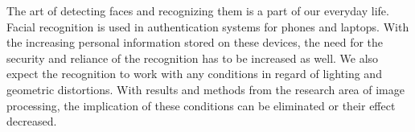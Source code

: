 The art of detecting faces and recognizing them is a part of our everyday life. Facial recognition is used in authentication systems for phones and laptops. With the increasing personal information stored on these devices, the need for the security and reliance of the recognition has to be increased as well. We also expect the recognition to work with any conditions in regard of lighting and geometric distortions. With results and methods from the research area of image processing, the implication of these conditions can be eliminated or their effect decreased.

